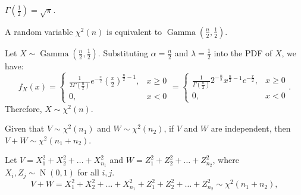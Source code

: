 \documentclass{huhtakm-template-book-v2}
\DeclareMathOperator{\N}{N}
\DeclareMathOperator{\Gam}{Gamma}
\begin{document}
    \begin{rem}
        $\Gamma(\frac{1}{2}) = \sqrt{\pi}$.
    \end{rem}
    \begin{lem}
        A random variable $\chi^{2}(n)$ is equivalent to $\Gam(\frac{n}{2},\frac{1}{2})$.
    \end{lem}
    \begin{proofing}
        Let $X \sim \Gam(\frac{n}{2},\frac{1}{2})$. Substituting $\alpha = \frac{n}{2}$ and $\lambda = \frac{1}{2}$ into the PDF of $X$, we have:
        \begin{equation*}
            f_{X}(x) = \begin{cases}
                \frac{1}{2\Gamma(\frac{n}{2})}e^{-\frac{x}{2}}\left(\frac{x}{2}\right)^{\frac{n}{2}-1}, &x \geq 0\\
                0, &x < 0
            \end{cases} = \begin{cases}
            \frac{1}{\Gamma(\frac{n}{2})}2^{-\frac{n}{2}}x^{\frac{n}{2}-1}e^{-\frac{x}{2}}, &x \geq 0\\
            0, &x < 0
            \end{cases}.
        \end{equation*}
        Therefore, $X \sim \chi^{2}(n)$.
    \end{proofing}
    \begin{lem}
        Given that $V \sim \chi^{2}(n_{1})$ and $W \sim \chi^{2}(n_{2})$, if $V$ and $W$ are independent, then $V+W \sim \chi^{2}(n_{1}+n_{2})$.
    \end{lem}
    \begin{proofing}
        Let $V = X_{1}^{2}+X_{2}^{2}+\dots+X_{n_{1}}^{2}$ and $W = Z_{1}^{2}+Z_{2}^{2}+\dots+Z_{n_{2}}^{2}$, where $X_{i},Z_{j} \sim \N(0,1)$ for all $i,j$.
        \begin{equation*}
            V+W = X_{1}^{2}+X_{2}^{2}+\dots+X_{n_{1}}^{2}+Z_{1}^{2}+Z_{2}^{2}+\dots+Z_{n_{2}}^{2} \sim \chi^{2}(n_{1}+n_{2}),
        \end{equation*}
    \end{proofing}
    \newpage
\end{document}
